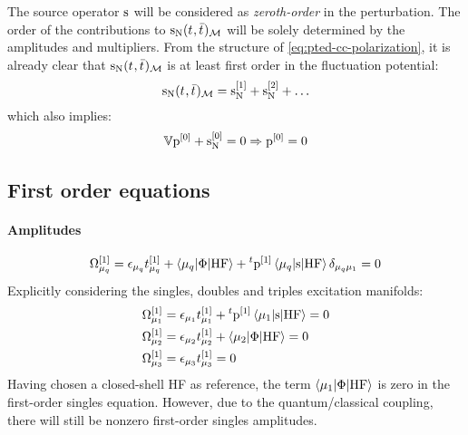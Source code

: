The source operator $\mathrm{s}$ will be considered as \emph{zeroth-order} in
the perturbation.
The order of the contributions to
$\mathrm{s}_{\mathrm{N}}(t_{},\bar{t}_{})_\mathcal{M}$ will be solely determined
by the amplitudes and multipliers. From the structure of
\eqref{eq:pted-cc-polarization}, it is already clear that
$\mathrm{s}_{\mathrm{N}}(t_{},\bar{t}_{})_\mathcal{M}$ is at least first order
in the fluctuation potential:
\begin{equation}
  \mathrm{s}_{\mathrm{N}}(t_{},\bar{t}_{})_\mathcal{M} =
  \mathrm{s}_{\mathrm{N}}^{[1]}
  + \mathrm{s}_{\mathrm{N}}^{[2]}
  + \ldots
\end{equation}
which also implies:
\begin{equation}
  \mathbb{V}\mathrm{p}^{[0]} + \mathrm{s}_{\mathrm{N}}^{[0]} = 0 \Rightarrow  \mathrm{p}^{[0]} = 0
\end{equation}

\subsection{First order equations}\label{sec:first-order-pt}

\paragraph*{Amplitudes}
\begin{equation}\label{eq:1st-order-amp}
  \Omega_{\mu_q}^{[1]} = \epsilon_{\mu_q}t_{\mu_q}^{[1]}
  + \braket{\mu_q | \Phi | \mathrm{HF}}
  + {}^t\mathrm{p}^{[1]}\braket{\mu_q | \mathrm{s} | \mathrm{HF}}\delta_{\mu_q\mu_1}
  = 0
\end{equation}
Explicitly considering the singles, doubles and triples excitation manifolds:
\begin{subequations}
  \begin{align}
  \Omega_{\mu_1}^{[1]} &= \epsilon_{\mu_1}t_{\mu_1}^{[1]}
  + {}^t\mathrm{p}^{[1]}\braket{\mu_1 | \mathrm{s} | \mathrm{HF}}
  = 0 \label{eq:1st-order-amp-singles} \\
  \Omega_{\mu_2}^{[1]} &= \epsilon_{\mu_2}t_{\mu_2}^{[1]}
  + \braket{\mu_2 | \Phi | \mathrm{HF}}
  = 0 \\
  \Omega_{\mu_3}^{[1]} &= \epsilon_{\mu_3}t_{\mu_3}^{[1]} = 0
  \end{align}
\end{subequations}
Having chosen a closed-shell \acrshort{HF} as reference,
the term $\braket{\mu_1 | \Phi | \mathrm{HF}}$ is zero in the
first-order singles equation. However, due to the quantum/classical
coupling, there will still be nonzero first-order singles amplitudes.

